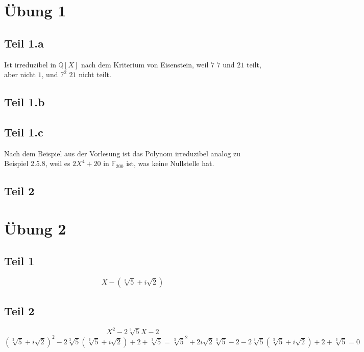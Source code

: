 \documentclass[10pt,a4paper]{article}
\begin{document}
\section{Übung 1}

\subsection{Teil 1.a}

Ist irreduzibel in $\mathbb{Q}[X]$ nach dem Kriterium von Eisenstein, weil $7$ $7$ und $21$ teilt, aber nicht $1$, und $7^{2}$ $21$ nicht teilt.

\subsection{Teil 1.b}



\subsection{Teil 1.c}

Nach dem Beispiel aus der Vorlesung ist das Polynom irreduzibel analog zu Beispiel 2.5.8, weil es $2X^{4} + 20$ in $\mathbb{F}_{200}$ ist, was keine Nullstelle hat.

\subsection{Teil 2}

\section{Übung 2}

\subsection{Teil 1}

\begin{equation}
  X - (\sqrt[3]{5} + i\sqrt{2})
\end{equation}

\subsection{Teil 2}

\begin{equation}
  X^{2} - 2\sqrt[3]{5}X - 2
\end{equation}
\begin{equation}
    (\sqrt[3]{5} + i\sqrt{2})^{2} - 2\sqrt[3]{5}(\sqrt[3]{5} + i\sqrt{2}) + 2 + \sqrt[3]{5} = \sqrt[3]{5}^{2} + 2i\sqrt{2}\sqrt[3]{5} - 2 - 2\sqrt[3]{5}(\sqrt[3]{5} + i\sqrt{2}) + 2 + \sqrt[3]{5} = 0
\end{equation}
\end{document}
